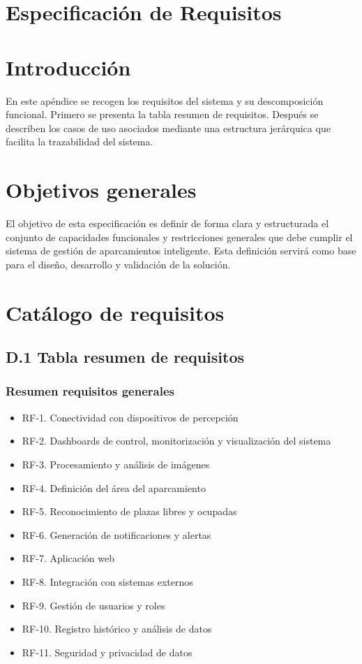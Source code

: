 \documentclass[12pt,a4paper]{article}
\newcommand{\apendice}[1]{%
	\clearpage
	\appendix
	\section{#1}%
}
\begin{document}
	
	\apendice{Especificación de Requisitos}
	
	\section{Introducción}
	
	En este apéndice se recogen los requisitos del sistema y su descomposición funcional.
	Primero se presenta la tabla resumen de requisitos.
	Después se describen los casos de uso asociados mediante una estructura jerárquica que facilita la trazabilidad del sistema.
	
	\section{Objetivos generales}
	
	El objetivo de esta especificación es definir de forma clara y estructurada el conjunto de capacidades funcionales y restricciones generales que debe cumplir el sistema de gestión de aparcamientos inteligente.
	Esta definición servirá como base para el diseño, desarrollo y validación de la solución.
	
	\section{Catálogo de requisitos}
	
	\subsection{D.1 Tabla resumen de requisitos}
	
	\subsubsection{Resumen requisitos generales}
	
	\begin{itemize}
		\item RF-1. Conectividad con dispositivos de percepción
		\item RF-2. Dashboards de control, monitorización y visualización del sistema
		\item RF-3. Procesamiento y análisis de imágenes
		\item RF-4. Definición del área del aparcamiento
		\item RF-5. Reconocimiento de plazas libres y ocupadas
		\item RF-6. Generación de notificaciones y alertas
		\item RF-7. Aplicación web
		\item RF-8. Integración con sistemas externos
		\item RF-9. Gestión de usuarios y roles
		\item RF-10. Registro histórico y análisis de datos
		\item RF-11. Seguridad y privacidad de datos
	\end{itemize}
	
\end{document}
